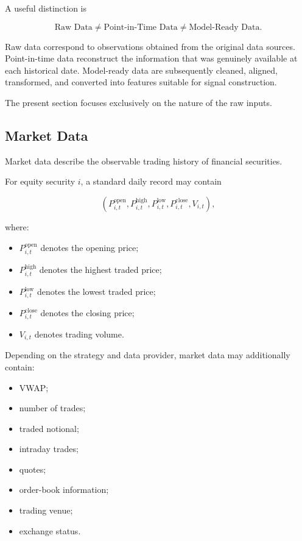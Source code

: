 \documentclass[11pt,a4paper]{article}
\begin{document}
A useful distinction is

\begin{equation}
\boxed{
\text{Raw Data}
\neq
\text{Point-in-Time Data}
\neq
\text{Model-Ready Data}.
}
\end{equation}

Raw data correspond to observations obtained from the original data sources.
Point-in-time data reconstruct the information that was genuinely available at
each historical date. Model-ready data are subsequently cleaned, aligned,
transformed, and converted into features suitable for signal construction.

The present section focuses exclusively on the nature of the raw inputs.


\subsection{Market Data}
\label{subsec:market_data}

Market data describe the observable trading history of financial securities.

For equity security $i$, a standard daily record may contain

\begin{equation}
\boxed{
\left(
P_{i,t}^{\mathrm{open}},
P_{i,t}^{\mathrm{high}},
P_{i,t}^{\mathrm{low}},
P_{i,t}^{\mathrm{close}},
V_{i,t}
\right),
}
\end{equation}

where:

\begin{itemize}
    \item $P_{i,t}^{\mathrm{open}}$ denotes the opening price;
    \item $P_{i,t}^{\mathrm{high}}$ denotes the highest traded price;
    \item $P_{i,t}^{\mathrm{low}}$ denotes the lowest traded price;
    \item $P_{i,t}^{\mathrm{close}}$ denotes the closing price;
    \item $V_{i,t}$ denotes trading volume.
\end{itemize}

Depending on the strategy and data provider, market data may additionally
contain:

\begin{itemize}
    \item VWAP;
    \item number of trades;
    \item traded notional;
    \item intraday trades;
    \item quotes;
    \item order-book information;
    \item trading venue;
    \item exchange status.
\end{itemize}
\end{document}

